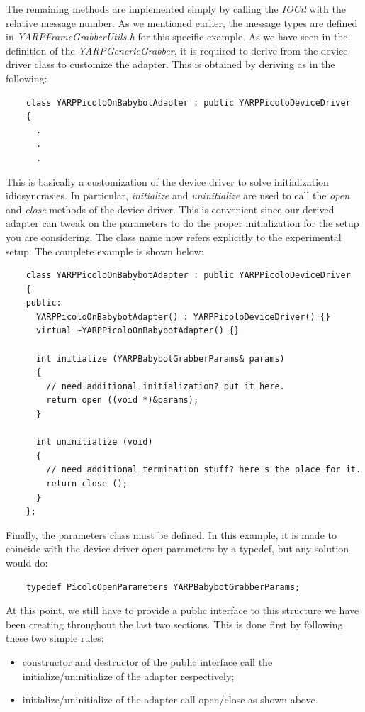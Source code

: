 The remaining methods are implemented simply by calling the {\em IOCtl} with the relative message number. As we mentioned earlier, the message types are defined in {\em YARPFrameGrabberUtils.h} for this specific example. As we have seen in the definition of the {\em YARPGenericGrabber}, it is required to derive from the device driver class to customize the adapter. This is obtained by deriving as in the following:

\begin{verbatim}
    class YARPPicoloOnBabybotAdapter : public YARPPicoloDeviceDriver
    {
      .
      .
      .
\end{verbatim}

This is basically a customization of the device driver to solve initialization idiosyncrasies. In particular, {\em initialize} and {\em uninitialize} are used to call the {\em open} and {\em close} methods of the device driver. This is convenient since our derived adapter can tweak on the parameters to do the proper initialization for the setup you are considering. The class name now refers explicitly to the experimental setup. The complete example is shown below:

\begin{verbatim}
    class YARPPicoloOnBabybotAdapter : public YARPPicoloDeviceDriver
    {
    public:
      YARPPicoloOnBabybotAdapter() : YARPPicoloDeviceDriver() {}
      virtual ~YARPPicoloOnBabybotAdapter() {}

      int initialize (YARPBabybotGrabberParams& params)
      {
        // need additional initialization? put it here.
        return open ((void *)&params);
      }

      int uninitialize (void)
      {
        // need additional termination stuff? here's the place for it.
        return close ();
      }
    };
\end{verbatim}

Finally, the parameters class must be defined. In this example, it is made to coincide with the device driver open parameters by a typedef, but any solution would do:

\begin{verbatim}
    typedef PicoloOpenParameters YARPBabybotGrabberParams;
\end{verbatim}

At this point, we still have to provide a public interface to this structure we have been creating throughout the last two sections. This is done first by following these two simple rules:
\begin{itemize}

\item constructor and destructor of the public interface call the initialize/uninitialize of the adapter respectively;

\item initialize/uninitialize of the adapter call open/close as shown above.

\end{itemize}

